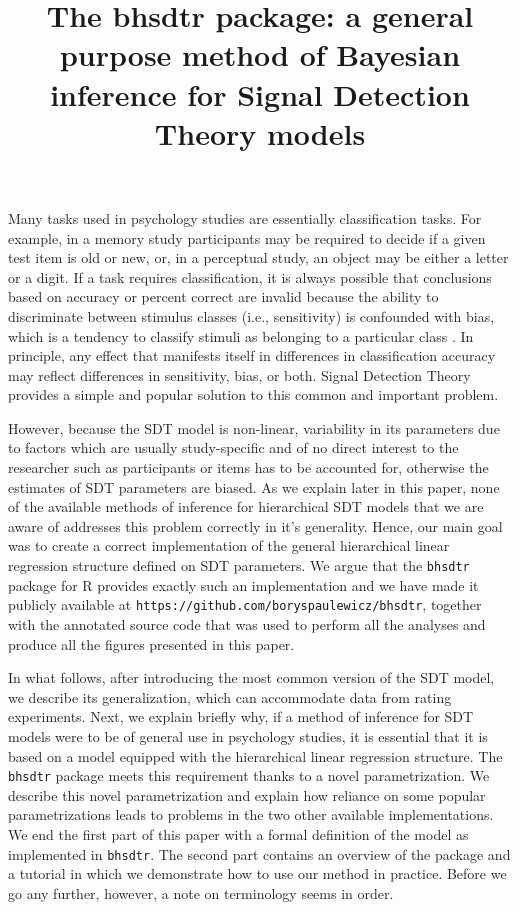 \documentclass[a4paper,man,apacite,floatsintext]{apa6}
\title{The bhsdtr package: a general purpose method of Bayesian
  inference for Signal Detection Theory models}
\newcommand{\code}[1]{\texttt{#1}}
\begin{document}
\maketitle
Many tasks used in psychology studies are essentially classification
tasks. For example, in a memory study participants may be required to
decide if a given test item is old or new, or, in a perceptual study,
an object may be either a letter or a digit. If a task requires
classification, it is always possible that conclusions based on
accuracy or percent correct are invalid because the ability to
discriminate between stimulus classes (i.e., sensitivity) is
confounded with bias, which is a tendency to classify stimuli as
belonging to a particular class \cite{GreenSwets66}. In principle, any
effect that manifests itself in differences in classification accuracy
may reflect differences in sensitivity, bias, or both. Signal
Detection Theory provides a simple and popular solution to this common
and important problem.

However, because the SDT model is non-linear, variability in its
parameters due to factors which are usually study-specific and of no
direct interest to the researcher such as participants or items has to
be accounted for, otherwise the estimates of SDT parameters are
biased. As we explain later in this paper, none of the available
methods of inference for hierarchical SDT models that we are aware of
addresses this problem correctly in it's generality. Hence, our main
goal was to create a correct implementation of the general
hierarchical linear regression structure defined on SDT parameters. We
argue that the \code{bhsdtr} package for R \cite{rstatistical}
provides exactly such an implementation and we have made it publicly
available at \code{https://github.com/boryspaulewicz/bhsdtr}, together
with the annotated source code that was used to perform all the
analyses and produce all the figures presented in this paper.

In what follows, after introducing the most common version of the SDT
model, we describe its generalization, which can accommodate data from
rating experiments. Next, we explain briefly why, if a method of
inference for SDT models were to be of general use in psychology
studies, it is essential that it is based on a model equipped with the
hierarchical linear regression structure. The \code{bhsdtr} package
meets this requirement thanks to a novel parametrization. We describe
this novel parametrization and explain how reliance on some popular
parametrizations leads to problems in the two other available
implementations. We end the first part of this paper with a formal
definition of the model as implemented in \code{bhsdtr}. The second
part contains an overview of the package and a tutorial in which we
demonstrate how to use our method in practice. Before we go any
further, however, a note on terminology seems in order.
\end{document}
